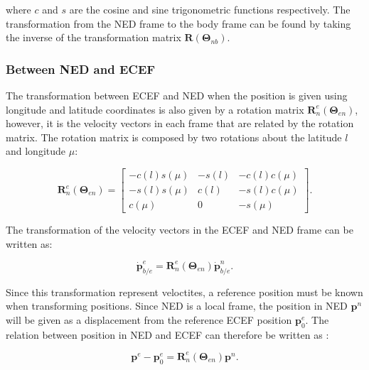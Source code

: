 where $c$ and $s$ are the cosine and sine trigonometric functions respectively. The transformation from the NED frame to the body frame can be found by taking the inverse of the transformation matrix $\mathbf{R}(\bm{\Theta}_{nb})$.

\subsubsection{Between NED and ECEF}

The transformation between ECEF and NED when the position is given using longitude and latitude coordinates is also given by a rotation matrix $\mathbf{R}_n^e(\bm{\Theta}_{en})$, however, it is the velocity vectors in each frame that are related by the rotation matrix. The rotation matrix is composed by two rotations about the latitude $l$ and longitude $\mu$:

\begin{equation}
	\mathbf{R}_n^e(\bm{\Theta}_{en}) =
	\begin{bmatrix}
		-c(l)s(\mu) & -s(l) & -c(l)c(\mu) \\
		-s(l)s(\mu) & c(l) & -s(l)c(\mu) \\
		c(\mu) & 0 & -s(\mu)
	\end{bmatrix}.
\end{equation}

The transformation of the velocity vectors in the ECEF and NED frame can be written as:

\begin{equation}
	\mathbf{\dot{p}}_{b/e}^e = \mathbf{R}_n^e(\bm{\Theta}_{en})\mathbf{\dot{p}}_{b/e}^n.
\end{equation}

Since this transformation represent veloctites, a reference position must be known when transforming positions. Since NED is a local frame, the position in NED $\mathbf{p}^n$ will be given as a displacement from the reference ECEF position $\mathbf{p}_0^e$. The relation between position in NED and ECEF can therefore be written as \cite{ROTATION}:

\begin{equation}
	\mathbf{p}^e - \mathbf{p}_0^e = \mathbf{R}_n^e(\bm{\Theta}_{en}) \mathbf{p}^n.
\end{equation} 